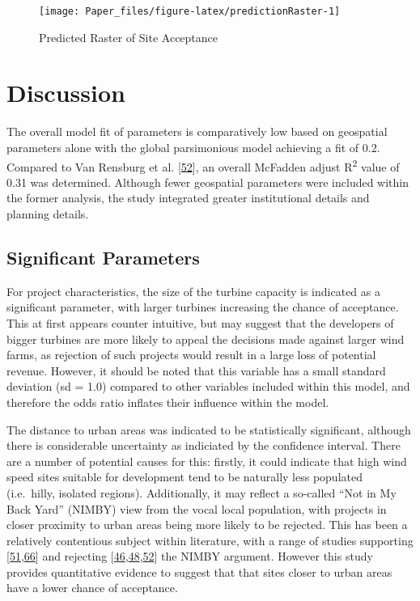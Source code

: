 \documentclass[a4paper,]{article}
\theoremstyle{definition}
\theoremstyle{definition}
\theoremstyle{definition}
\theoremstyle{remark}
\begin{document}
\begin{figure}[h]

{\centering \texttt{[image: Paper\_files/figure-latex/predictionRaster-1]} 

}

\caption{Predicted Raster of Site Acceptance}\label{fig:predictionRaster}
\end{figure}

\section{Discussion}\label{discussion}

The overall model fit of parameters is comparatively low based on
geospatial parameters alone with the global parsimonious model achieving
a fit of 0.2. Compared to Van Rensburg et al.
{[}\protect\hyperlink{ref-VanRensburg20}{52}{]}, an overall McFadden
adjust R\textsuperscript{2} value of 0.31 was determined. Although fewer
geospatial parameters were included within the former analysis, the
study integrated greater institutional details and planning details.

\subsection{Significant Parameters}\label{significant-parameters}

For project characteristics, the size of the turbine capacity is
indicated as a significant parameter, with larger turbines increasing
the chance of acceptance. This at first appears counter intuitive, but
may suggest that the developers of bigger turbines are more likely to
appeal the decisions made against larger wind farms, as rejection of
such projects would result in a large loss of potential revenue.
However, it should be noted that this variable has a small standard
deviation (sd = 1.0) compared to other variables included within this
model, and therefore the odds ratio inflates their influence within the
model.

The distance to urban areas was indicated to be statistically
significant, although there is considerable uncertainty as indiciated by
the confidence interval. There are a number of potential causes for
this: firstly, it could indicate that high wind speed sites suitable for
development tend to be naturally less populated (i.e.~hilly, isolated
regions). Additionally, it may reflect a so-called ``Not in My Back
Yard'' (NIMBY) view from the vocal local population, with projects in
closer proximity to urban areas being more likely to be rejected. This
has been a relatively contentious subject within literature, with a
range of studies supporting
{[}\protect\hyperlink{ref-Haggett2006}{51},\protect\hyperlink{ref-Jones2010a}{66}{]}
and rejecting
{[}\protect\hyperlink{ref-Populus2005}{46},\protect\hyperlink{ref-Devine-Wright2005a}{48},\protect\hyperlink{ref-VanRensburg20}{52}{]}
the NIMBY argument. However this study provides quantitative evidence to
suggest that that sites closer to urban areas have a lower chance of
acceptance.
\end{document}
